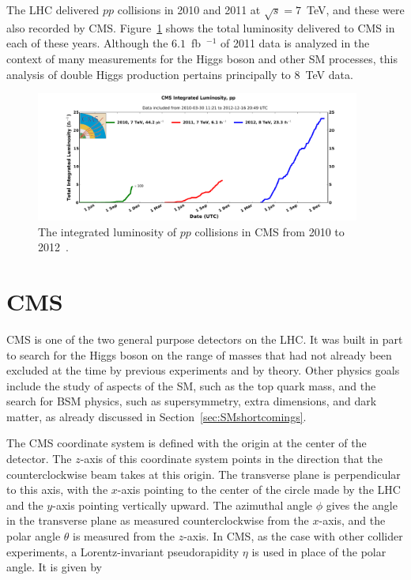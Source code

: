 The LHC delivered $pp$ collisions in 2010 and 2011 at $\sqrt{s} = 7$~TeV,
and these were also recorded by CMS.
Figure~\ref{fig:intlumi101112} shows the total luminosity delivered to CMS in each of these years.
Although the $6.1$~fb~$^{-1}$ of 2011 data is analyzed in the context of
many measurements for the Higgs boson and
other SM processes, this analysis of double Higgs production pertains principally to 8~TeV data.

\begin{figure}[ht]
 \begin{center}
    \includegraphics[width=0.95\textwidth]{figures/experiment/int_lumi_cumulative_pp_1.pdf}
      \end{center}
\caption{The integrated luminosity of $pp$ collisions in CMS from 2010 to 2012~\cite{CMS:lumi}.}
\label{fig:intlumi101112}
\end{figure}


\section{CMS\label{sec:CMS}}

CMS is one of the two general purpose detectors on the LHC. It was built in part
to search for the Higgs boson on the range of masses that had not already been excluded
at the time by previous experiments
and by theory. Other physics goals include
the study of aspects of the SM, such as the top quark mass, and the search for BSM physics, such
as supersymmetry, extra dimensions, and dark matter, as already discussed in
Section~\ref{sec:SMshortcomings}.

The CMS coordinate system is defined with the origin at the center of the detector. The $z$-axis
of this coordinate system points in the direction that the counterclockwise beam takes at this origin.
The transverse plane is perpendicular to this axis, with the $x$-axis pointing to the center of the
circle made by the LHC and the $y$-axis pointing vertically upward. The azimuthal angle $\phi$ gives
the angle in the transverse plane as measured counterclockwise from the $x$-axis, and the polar angle
$\theta$ is measured from the $z$-axis. In CMS, as the case with other collider experiments,
a Lorentz-invariant pseudorapidity $\eta$ is used in place of the polar angle. It is given by

